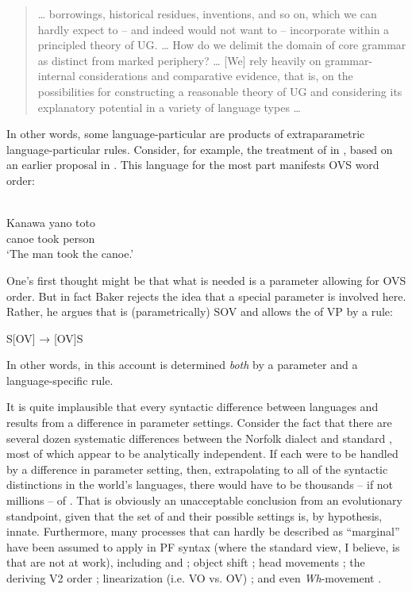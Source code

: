 \documentclass[output=paper,
modfonts
]{LSP/langsci}
\begin{document}
\begin{quote}
\ldots{} borrowings, historical residues, inventions, and so on, which
we can hardly expect to  --  and indeed would not want to  --  incorporate
within a principled theory of UG. \ldots{} How do we delimit the domain
of core grammar as distinct from marked periphery? \ldots{} {[}We{]}
rely heavily on grammar-internal considerations and comparative
evidence, that is, on the possibilities for constructing a reasonable
theory of UG and considering its explanatory potential in a variety of
language types \ldots{} \citep[8--9]{chomsky1981}
\end{quote}

In other words, some language-particular  are products of
extraparametric language-particular rules. Consider, for example, the
treatment of  in \citet{baker2001}, based on an earlier proposal in
\citet{kayne1994}. This language for the most part manifests OVS word order:

\ea 
{}\\
 \gll Kanawa yano toto\\  
canoe took person\\
\glt `The man took the canoe.' 
\z

One's first thought might be that what is needed is a parameter allowing
for OVS order. But in fact Baker rejects the idea that a special  parameter is involved here. Rather, he argues that  is
(parametrically) SOV and allows the  of VP by a  rule:

\ea S{[}OV{]} → {[}OV{]}S
\z

In other words, in this account  is determined \emph{both} by
a parameter and a language-specific rule.

It is quite implausible that every syntactic difference between
languages and  results from a difference in parameter settings.
Consider the fact that there are several dozen systematic
 differences between the Norfolk dialect and standard
 \citep{trudgill2003}, most of which appear to be analytically
independent. If each were to be handled by a difference in parameter
setting, then, extrapolating to all of the syntactic distinctions in the
world's languages, there would have to be thousands  --  if not millions
 --  of . That is obviously an unacceptable conclusion from an
evolutionary standpoint, given that the set of  and their
possible settings is, by hypothesis, innate. Furthermore, many processes
that can hardly be described as ``marginal'' have been assumed to apply in
PF syntax (where the standard view, I believe, is that  are
not at work), including  and  \citep{chomsky1995};
object shift \citep{holmberg1999,erteschik-shir2005}; head movements
\citep{boeckx2001}; the  deriving V2 order \citep{chomsky2001b}; linearization (i.e. VO vs. OV) \citep{chomsky1995,takano1996,fukui1998,uriagereka1999}; and even \emph{Wh}-movement
\citep{erteschik-shir2005}.
\end{document}
